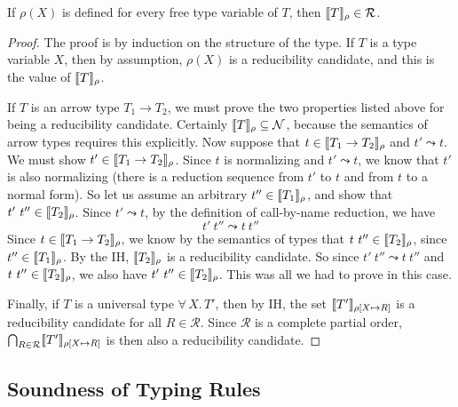 \documentclass{article}
\begin{document}
\begin{lemma}
\label{lem:semred}
  If $\rho(X)$ is defined for every free type variable of $T$, then
  $\llbracket T \rrbracket_\rho \in \mathcal{R}$.
\end{lemma}
\begin{proof}
  The proof is by induction on the structure of the type.  If $T$ is a
  type variable $X$, then by assumption, $\rho(X)$ is a reducibility
  candidate, and this is the value of $\llbracket T \rrbracket_\rho$.

  If $T$ is an arrow type $T_1 \to T_2$, we must prove the two
  properties listed above for being a reducibility candidate.
  Certainly $\llbracket T \rrbracket_\rho\subseteq\mathcal{N}$, because the
  semantics of arrow types requires this explicitly.  Now suppose that
  $t\in\llbracket T_1\to T_2 \rrbracket_\rho$ and $t'\leadsto t$.  We must show
  $t'\in\llbracket T_1\to T_2 \rrbracket_\rho$.  Since $t$ is normalizing and
  $t'\leadsto t$, we know that $t'$ is also normalizing (there is a
  reduction sequence from $t'$ to $t$ and from $t$ to a normal form).
  So let us assume an arbitrary $t''\in\llbracket T_1 \rrbracket_\rho$, and show
  that $t'\ t''\in\llbracket T_2 \rrbracket_\rho$.  Since $t' \leadsto t$, by the
  definition of call-by-name reduction, we have
\[
t'\ t'' \leadsto t\ t''
\]
Since $t\in\llbracket T_1\to T_2 \rrbracket_\rho$, we know by the semantics of
types that $t\ t''\in\interp{T_2}_\rho$, since
$t''\in\llbracket T_1 \rrbracket_\rho$.  By the IH, $\llbracket T_2 \rrbracket_\rho$ is a
reducibility candidate.  So since $t'\ t''\leadsto t\ t''$ and $t\
t''\in\llbracket T_2 \rrbracket_\rho$, we also have $t'\ t''\in\llbracket T_2 \rrbracket_\rho$.
This was all we had to prove in this case.

Finally, if $T$ is a universal type $\forall\, X.\,T'$, then by IH, the
set $\llbracket T' \rrbracket_{\rho[X\mapsto R]}$ is a reducibility candidate for
all $R\in\mathcal{R}$.  Since $\mathcal{R}$ is a complete partial
order, $\bigcap_{R\in\mathcal{R}}\llbracket T' \rrbracket_{\rho[X\mapsto R]}$ is
then also a reducibility candidate.

\end{proof}

\subsection{Soundness of Typing Rules}
\end{document}
